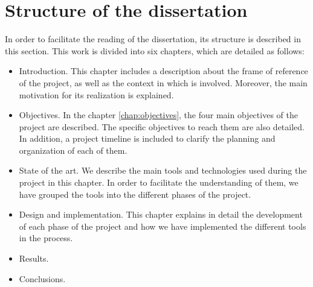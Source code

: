 \section{Structure of the dissertation}
\label{sec:structure}

In order to facilitate the reading of the dissertation, its structure is described in this section. This work is divided into six chapters, which are detailed as follows:

\begin{itemize}
  \item Introduction. This chapter includes a description about the frame of reference of the project, as well as the context in which is involved. Moreover, the main motivation for its realization is explained.
  
  \item Objectives. In the chapter \ref{chap:objectives}, the four main objectives of the project are described. The specific objectives to reach them are also detailed. In addition, a project timeline is included to clarify the planning and organization of each of them.
  
  \item State of the art. We describe the main tools and technologies used during the project in this chapter. In order to facilitate the understanding of them, we have grouped the tools into the different phases of the project.
  
  \item Design and implementation. This chapter explains in detail the development of each phase of the project and how we have implemented the different tools in the process. 
  
  \item Results.
  
  \item Conclusions.
  
\end{itemize}

